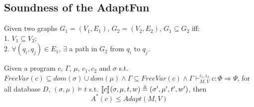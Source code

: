 \documentclass[a4paper,11pt]{article}
\newcommand{\THESYSTEM}{\textsf{AdaptFun}}
\begin{document}
\subsection{Soundness of the \THESYSTEM}
\begin{defn}
[Subgraph]
Given two graphs $G_1 = (V_1, E_1)$, $G_2 = (V_2, E_2)$, $G_1 \subseteq G_2$ iff:
\\
1. $V_1 \subseteq V_2$;
\\
2. $\forall (q_i, q_j) \in E_1$, $\exists $ a path in $G_2$ from $q_i$ to $q_j$.
\end{defn}
%
%
\begin{thm}
[Soundness]
Given a program $c$, $\Gamma$, $\mu$, $c_1, c_2$ and $\sigma$ s.t. $
FreeVar(c) \subseteq dom(\sigma) \cup dom(\mu)  
\land \Gamma \subseteq FreeVar(c) 
\land \Gamma \vdash_{M,V}^{i_1,i_2} c : \Phi \Rightarrow \Psi$,
 for all database $D$, $(\sigma, \mu) \vDash t$ s.t. 
$\llbracket c \rrbracket_{} (\sigma, \mu , t ,w )  \triangleq  (\sigma' , \mu' , t', w' )$,
then
\[
A^*(c) \leq Adapt(M, V)
\]
\end{thm}
\end{document}
